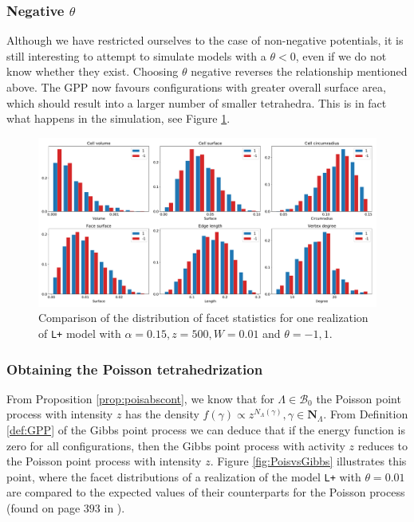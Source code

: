 \subsubsection{ Negative $\theta$ }
Although we have restricted ourselves to the case of non-negative potentials, it is still interesting to attempt to simulate models with a $\theta<0$, even if we do not know whether they exist. Choosing $\theta$ negative reverses the relationship mentioned above. The GPP now favours configurations with greater overall surface area, which should result into a larger number of smaller tetrahedra. This is in fact what happens in the simulation, see Figure \ref{fig:thetanegative}.


\begin{figure}
  \centering
    \includegraphics[width=1\textwidth]{../img/numeric/facets_1_-1.pdf}
  \caption{Comparison of the distribution of facet statistics for one realization of \texttt{L+} model with $\alpha=0.15,z=500,W=0.01$ and $\theta = -1,1$.  }
  \label{fig:thetanegative}
\end{figure}




\subsubsection{Obtaining the Poisson tetrahedrization}
From Proposition \ref{prop:poisabscont}, we know that for $\Lambda \in \mathcal B_0$ the Poisson point process with intensity $z$ has the density $f(\gamma)\propto z^{N_\Lambda(\gamma)}, \gamma \in \mathbf N_\Lambda$. From Definition \ref{def:GPP} of the Gibbs point process we can deduce that if the energy function is zero for all configurations, then the Gibbs point process with activity $z$ reduces to the Poisson point process with intensity $z$.  Figure \ref{fig:PoisvsGibbs} illustrates this point, where the facet distributions of a realization of the model \texttt{L+} with $\theta=0.01$ are compared to the expected values of their counterparts for the Poisson process (found on page $393$ in \cite{Okabe1992}).

